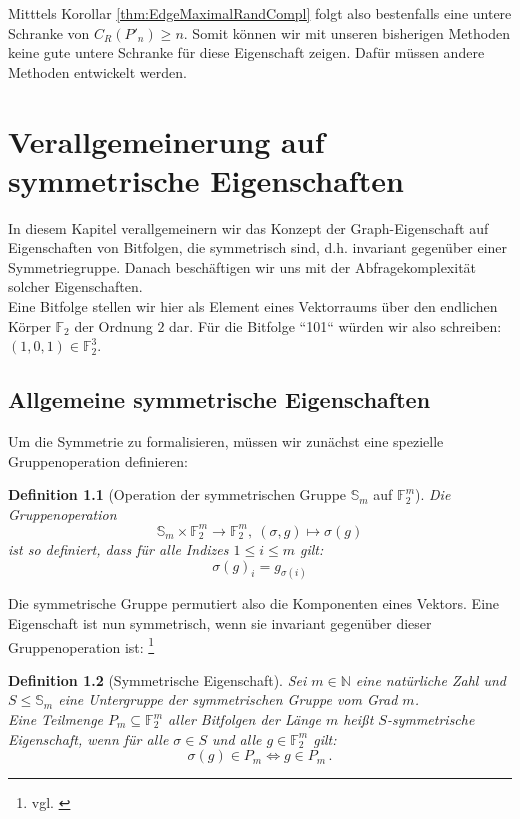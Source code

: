 \documentclass[10pt,a4paper]{scrreprt}
\newtheorem{definition}{Definition}
\theoremstyle{definition}
\begin{document}
Mitttels Korollar \ref{thm:EdgeMaximalRandCompl} folgt also bestenfalls
eine untere Schranke von $C_R(P'_n) \geq n$. Somit können
wir mit unseren bisherigen Methoden keine gute untere Schranke
für diese Eigenschaft zeigen. Dafür müssen andere Methoden
entwickelt werden.

\chapter{Verallgemeinerung auf symmetrische Eigenschaften}
In diesem Kapitel verallgemeinern wir das Konzept der
Graph-Eigenschaft auf Eigenschaften von Bitfolgen, die
symmetrisch sind, d.h. invariant gegenüber einer Symmetriegruppe.
Danach beschäftigen wir uns mit der Abfragekomplexität
solcher Eigenschaften. \\
Eine Bitfolge stellen wir hier als Element eines Vektorraums
über den endlichen Körper $\mathbb{F}_2$ der Ordnung $2$ dar.
Für die Bitfolge ``101`` würden wir also schreiben:
$ (1,0,1) \in \mathbb{F}_2^3$.

\section{Allgemeine symmetrische Eigenschaften}
Um die Symmetrie zu formalisieren, müssen wir zunächst
eine spezielle Gruppenoperation definieren:

\begin{definition}
[Operation der symmetrischen Gruppe $\mathbb{S}_m$ auf $\mathbb{F}_2^m$]
Die Gruppenoperation
$$\mathbb{S}_m \times \mathbb{F}_2^m \to \mathbb{F}_2^m, 
  \ (\sigma,g) \mapsto \sigma(g)$$
ist so definiert, dass für alle Indizes $1\leq i \leq m$ gilt:
$$ \sigma(g)_i = g_{\sigma(i)} $$
\end{definition}
Die symmetrische Gruppe permutiert also die Komponenten eines
Vektors. Eine Eigenschaft ist nun symmetrisch, wenn sie invariant
gegenüber dieser Gruppenoperation ist:
\footnote{vgl. \cite[S.7]{Rivest}}

\begin{definition}[Symmetrische Eigenschaft]
Sei $m\in \mathbb{N}$ eine natürliche Zahl und
$S \leq \mathbb{S}_m$ eine Untergruppe der 
symmetrischen Gruppe vom Grad $m$. \\
Eine Teilmenge
$P_m \subseteq \mathbb{F}_2^m$ aller Bitfolgen der
Länge $m$ heißt \emph{$S$-symmetrische Eigenschaft}, wenn
für alle $\sigma \in S$ und alle $g\in \mathbb{F}_2^m$ gilt:
$$ \sigma(g)\in P_m \iff g \in P_m\,.$$ 
\end{definition}
\end{document}
